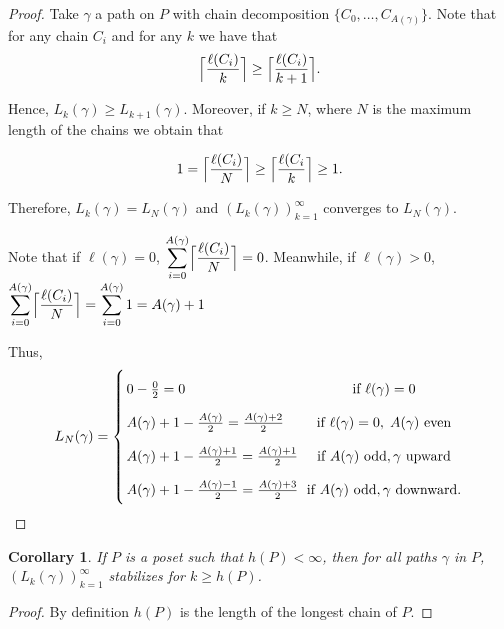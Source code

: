 \documentclass{article}[12pt]
\theoremstyle{exampstyle}
\newtheorem{corollary}[theorem]{Corollary}
\theoremstyle{remark}
\DeclarePairedDelimiter{\ceil}{\lceil}{\rceil}
\newcommand{\myceil}[2][k]{\ceil[\Big]{\frac{#2 }{#1}}}
\newcommand{\tuple}[3][1]{#2_{#1}, \dots , #2_{#3}}
\begin{document}
\begin{proof}
    Take $\gamma$ a path on $P$ with chain decomposition $\{ \tuple[0]{C}{A(\gamma)}\}$. Note that for any chain $C_i$ and for any $k$ we have that \[\myceil{\ell(C_i)} \geq \myceil[k+1]{\ell(C_i)}.\] 
    
    Hence, $L_{k}(\gamma) \geq L_{k+1}(\gamma)$. Moreover, if  $ k \geq N$, where $N$ is the maximum length of the chains we obtain that 

    \[1 =  \myceil[N]{\ell(C_i)} \geq \myceil{\ell(C_i} \geq 1. \] 
        
    Therefore, $L_k(\gamma) =  L_N(\gamma)$ and  $\left( L_k(\gamma) \right)_{k=1}^\infty$ converges to $L_{N}(\gamma)$.

    Note that if $\ell(\gamma) =0$, $\displaystyle \sum\limits_{i=0}^{A(\gamma)} \myceil[N]{\ell(C_i)} = 0$. Meanwhile, if $\ell(\gamma) > 0$,  $\displaystyle \sum\limits_{i=0}^{A(\gamma)} \myceil[N]{\ell(C_i)} =  \sum\limits_{i=0}^{A(\gamma)} 1  = A(\gamma)+1 $ 
    
    Thus, 
    \begin{equation*}
            \arraycolsep=1.4pt\def\arraystretch{2}
            L_N(\gamma) = \left\{ 
            \begin{array}{lc}   
                0 - \frac{0}{2} = 0 & \text{ if } \ell(\gamma)=0 \\ 
                A(\gamma) + 1- \frac{A(\gamma)}{2} = \frac{A(\gamma) + 2}{2} &  \text{ if } \ell(\gamma)=0, \; A(\gamma) \text{ even}\\
                A(\gamma) + 1- \frac{A(\gamma)+1}{2} = \frac{A(\gamma)+1}{2} &  \text{ if } A(\gamma) \text{ odd}, \gamma \text{ upward}\\
                A(\gamma) + 1- \frac{A(\gamma)-1}{2} = \frac{A(\gamma)+3}{2}&  \text{ if } A(\gamma) \text{ odd}, \gamma \text{ downward}.\\
            \end{array}
            \right.
        \end{equation*}
\end{proof}

\begin{corollary}
    If $P$ is a poset such that $h(P) < \infty$, then for all paths $\gamma$ in $P$,  $\left( L_k(\gamma) \right)_{k=1}^\infty$ stabilizes for $k \geq h(P)$.
\end{corollary}
\begin{proof}
    By definition $h(P)$ is the length of the longest chain of $P$.
\end{proof}
\end{document}
